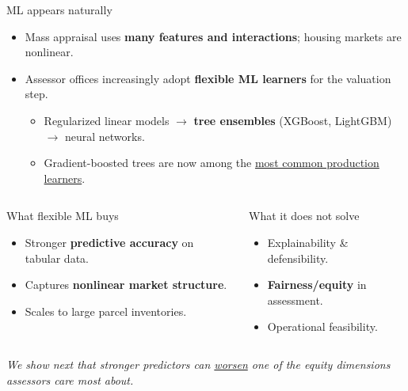\documentclass[aspectratio=169,12pt,]{beamer}
\newcommand{\1}{\mathbf{1}}
\begin{document}
\begin{frame}{ML appears naturally}

\begin{itemize}
    \item Mass appraisal uses \textbf{many features and interactions}; housing markets are nonlinear.
    \medskip
    \item Assessor offices increasingly adopt \textbf{flexible ML learners} for the valuation step.
    \begin{itemize}
        \item Regularized linear models $\rightarrow$ \textbf{tree ensembles} (XGBoost, LightGBM) $\rightarrow$ neural networks.
        \item Gradient-boosted trees are now among the \underline{most common production learners}.
    \end{itemize}
\end{itemize}

\medskip

\begin{columns}[T,onlytextwidth]
\begin{block}{ What flexible ML buys}
\begin{itemize}
    \item Stronger \textbf{predictive accuracy} on tabular data.
    \item Captures \textbf{nonlinear market structure}.
    \item Scales to large parcel inventories.
\end{itemize}
\end{block}

\begin{block}{ What it does not solve}
\begin{itemize}
    \item Explainability \& defensibility.
    \item \textbf{Fairness/equity} in assessment.
    \item Operational feasibility.
\end{itemize}
\end{block}
\end{columns}

\vspace{2mm}
{\footnotesize\itshape
We show next that stronger predictors can \underline{worsen} one of the equity dimensions assessors care most about.
}

\end{frame}
\end{document}
